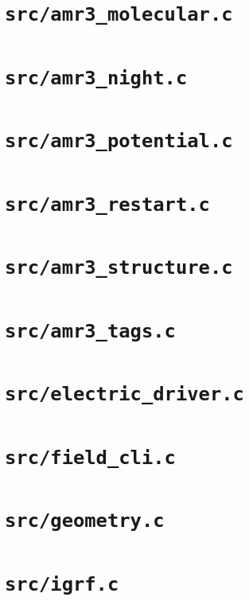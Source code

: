 \documentclass[9pt,a4paper]{extarticle}
\begin{document}
\section{\texttt{src/amr3\_molecular.c}}

\clearpage
\section{\texttt{src/amr3\_night.c}}

\clearpage
\section{\texttt{src/amr3\_potential.c}}

\clearpage
\section{\texttt{src/amr3\_restart.c}}

\clearpage
\section{\texttt{src/amr3\_structure.c}}

\clearpage
\section{\texttt{src/amr3\_tags.c}}

\clearpage
\section{\texttt{src/electric\_driver.c}}

\clearpage
\section{\texttt{src/field\_cli.c}}

\clearpage
\section{\texttt{src/geometry.c}}

\clearpage
\section{\texttt{src/igrf.c}}

\clearpage
\end{document}
